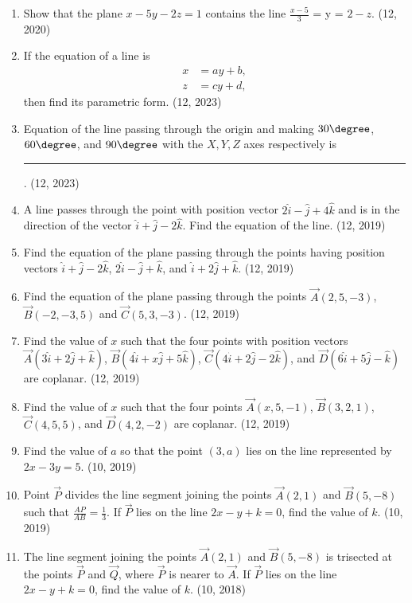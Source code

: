 \begin{enumerate}[label=\thesubsection.\arabic*, ref=\thesubsection.\theenumi]
\item Show that the plane $x - 5y - 2z = 1$ contains the line $\frac{x - 5}{3}$ = y = $2 -z$.
\hfill (12, 2020)
    \item If the equation of a line is
    \begin{align*}
        x &= ay + b, \\
        z &= cy + d,
    \end{align*}
    then find its parametric form.
    \hfill (12, 2023)
    \item Equation of the line passing through the origin and making $30\degree$, $60\degree$, and $90\degree$ with the $X, Y, Z$ axes respectively is
\rule{1cm}{0.1pt}.
    \hfill (12, 2023)
	\item A line passes through the point with position vector $2\hat{i} - \hat{j} + 4\hat{k}$ and is in the direction of the vector $\hat{i} + \hat{j} - 2\hat{k}$. Find the equation of the line. \hfill (12, 2019)
	\item Find the equation of the plane passing through the points having position vectors $\hat{i} + \hat{j} - 2\hat{k}$, $2\hat{i} - \hat{j} + \hat{k}$, and $\hat{i} + 2\hat{j} + \hat{k}$. (12, 2019)
	\item Find the equation of the plane passing through the points $\vec{A}(2, 5, -3)$, $\vec{B}(-2, -3, 5)$ and $\vec{C}(5, 3, -3)$. \hfill (12, 2019)
	\item Find the value of $x$ such that the four points with position vectors $\vec{A}(3\hat{i} + 2\hat{j} + \hat{k})$, $\vec{B}(4\hat{i} + x\hat{j} + 5\hat{k})$, $\vec{C}(4\hat{i} + 2\hat{j} - 2\hat{k})$, and $\vec{D}(6\hat{i} + 5\hat{j} - \hat{k})$ are coplanar. \hfill (12, 2019)
	\item Find the value of $x$ such that the four points $\vec{A}(x, 5, -1)$, $\vec{B}(3, 2, 1)$, $\vec{C}(4, 5, 5)$, and $\vec{D}(4, 2, -2)$ are coplanar. \hfill (12, 2019)
\item Find the value of $a$ so that the point $(3, a)$ lies on the line represented by $2x - 3y = 5$. \hfill (10, 2019)
\item Point $\vec{P}$ divides the line segment joining the points $\vec{A}(2, 1)$ and $\vec{B}(5, -8)$ such that $\frac{AP}{AB} = \frac{1}{3}$. If $\vec{P}$ lies on the line $2x - y + k = 0$, find the value of $k$. \hfill (10, 2019)
    \item The line segment joining the points $\vec{A}(2,1)$ and $\vec{B}(5,-8)$ is trisected at the points $\vec{P}$ and $\vec{Q}$, where $\vec{P}$ is nearer to $\vec{A}$. If $\vec{P}$ lies on the line $2x - y + k = 0$, find the value of $k$. \hfill (10, 2018)

\end{enumerate}
